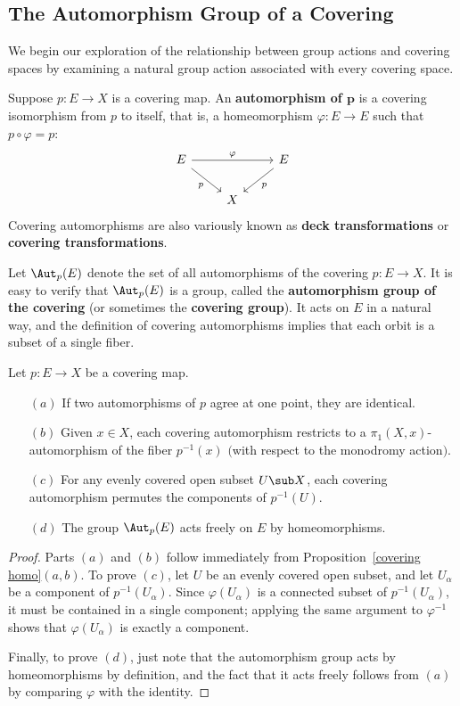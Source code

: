 \subsection{The Automorphism Group of a Covering}
We begin our exploration of the relationship between group actions and covering spaces by examining a natural group action associated with every covering space.\par
Suppose $p:E\to X$ is a covering map. An \textbf{automorphism of $\bm{p}$} is a covering isomorphism from $p$ to itself, that is, a homeomorphism $\varphi:E\to E$ such that $p\circ\varphi=p$:
\[\begin{tikzcd}
E\ar[rr,"\varphi"]\ar[rd,swap,"p"]&&E\ar[ld,"p"]\\
&X&
\end{tikzcd}\]
Covering automorphisms are also variously known as \textbf{deck transformations} or \textbf{covering transformations}.\par
Let $\Aut_p(E)$ denote the set of all automorphisms of the covering $p:E\to X$. It is easy to verify that $\Aut_p(E)$ is a group, called the \textbf{automorphism group of the covering} (or sometimes the \textbf{covering group}). It acts on $E$ in a natural way, and the definition of covering automorphisms implies that each orbit is a subset of a single fiber.
\begin{proposition}\label{auto group prop}
Let $p:E\to X$ be a covering map.
\begin{itemize}
\item[$(a)$]If two automorphisms of $p$ agree at one point, they are identical.
\item[$(b)$]Given $x\in X$, each covering automorphism restricts to a $\pi_1(X,x)$-automorphism of the fiber $p^{-1}(x)$ $($with respect to the monodromy action$)$.
\item[$(c)$]For any evenly covered open subset $U\sub X$, each covering automorphism permutes the components of $p^{-1}(U)$.
\item[$(d)$]The group $\Aut_p(E)$ acts freely on $E$ by homeomorphisms.
\end{itemize}
\end{proposition}
\begin{proof}
Parts $(a)$ and $(b)$ follow immediately from Proposition~\ref{covering homo}$(a,b)$. To prove $(c)$, let $U$ be an evenly covered open subset, and let $U_\alpha$ be a component of $p^{-1}(U_\alpha)$. Since $\varphi(U_\alpha)$ is a connected subset of $p^{-1}(U_\alpha)$, it must be contained in a single component;
applying the same argument to $\varphi^{-1}$ shows that $\varphi(U_\alpha)$ is exactly a component.\par
Finally, to prove $(d)$, just note that the automorphism group acts by homeomorphisms by definition, and the fact that it acts freely follows from $(a)$ by comparing $\varphi$ with the identity.
\end{proof}
